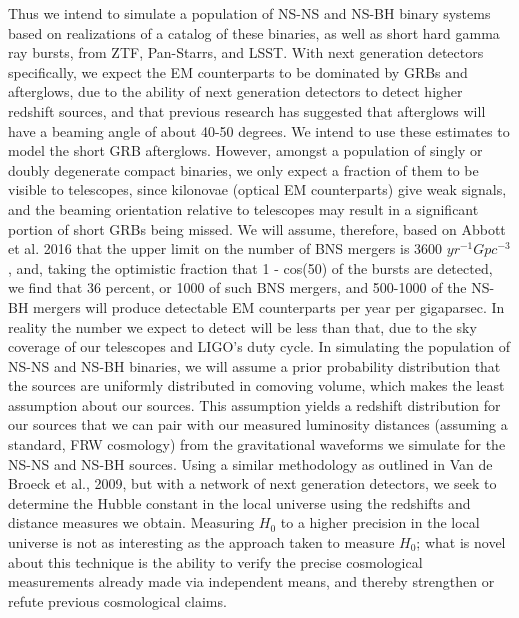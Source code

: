 \documentclass{article}
\begin{document}
Thus we intend to simulate a population of NS-NS and NS-BH binary systems based on realizations of a catalog of these binaries, as well as short hard gamma ray bursts, from ZTF, Pan-Starrs, and LSST.  With next generation detectors specifically, we expect the EM counterparts to be dominated by GRBs and afterglows, due to the ability of next generation detectors to detect higher redshift sources, and that previous research has suggested that afterglows will have a beaming angle of about 40-50 degrees.  We intend to use these estimates to model the short GRB afterglows.  However, amongst a population of singly or doubly degenerate compact binaries, we only expect a fraction of them to be visible to telescopes, since kilonovae (optical EM counterparts) give weak signals, and the beaming orientation relative to telescopes may result in a significant portion of short GRBs being missed.  We will assume, therefore, based on Abbott et al. 2016 that the upper limit on the number of BNS mergers is 3600 $yr^{-1}Gpc^{-3}$, and, taking the optimistic fraction that 1 - cos(50) of the bursts are detected, we find that 36 percent, or 1000 of such BNS mergers, and 500-1000 of the NS-BH mergers will produce detectable EM counterparts per year per gigaparsec.  In reality the number we expect to detect will be less than that, due to the sky coverage of our telescopes and LIGO's duty cycle.  In simulating the population of NS-NS and NS-BH binaries, we will assume a prior probability distribution that the sources are uniformly distributed in comoving volume, which makes the least assumption about our sources.  This assumption yields a redshift distribution for our sources that we can pair with our measured luminosity distances (assuming a standard, FRW cosmology) from the gravitational waveforms we simulate for the NS-NS and NS-BH sources.  Using a similar methodology as outlined in Van de Broeck et al., 2009, but with a network of next generation detectors, we seek to determine the Hubble constant in the local universe using the redshifts and distance measures we obtain.  Measuring $H_{0}$ to a higher precision in the local universe is not as interesting as the approach taken to measure $H_{0}$; what is novel about this technique is the ability to verify the precise cosmological measurements already made via independent means, and thereby strengthen or refute previous cosmological claims.
\end{document}
